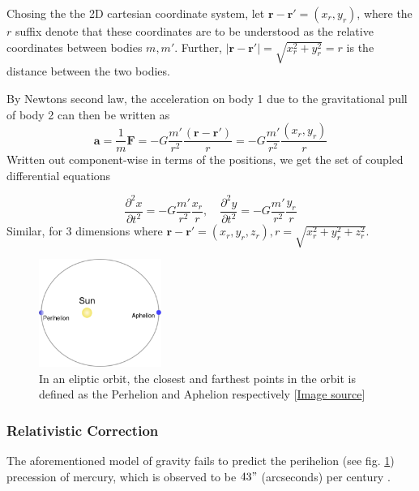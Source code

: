 \documentclass[10pt,showpacs,preprintnumbers,footinbib,amsmath,amssymb,aps,prl,twocolumn,groupedaddress,superscriptaddress,showkeys]{revtex4-1}
\begin{document}
    Chosing the the 2D cartesian coordinate system, let $\mathbf r - \mathbf r'= (x_{r}, y_{r})$, where the $r$ suffix denote that these coordinates are to be understood as the relative coordinates between bodies $m, m'$.
    Further, $|\mathbf r - \mathbf r'| = \sqrt{x_r^2 + y_r^2} = r$ is the distance between the two bodies.

    By Newtons second law, the acceleration on body 1 due to the gravitational pull of body 2 can then be written as
    \begin{equation}
      \mathbf a = \frac{1}{m}\mathbf F = -G \frac{m'}{r^2}\frac{(\mathbf r-\mathbf r')}{r} = -G\frac{m'}{r^2}\frac{\left(x_r, y_r\right)}{r}
    \end{equation}
    Written out component-wise in terms of the positions, we get the set of coupled differential equations

    \begin{equation}
      \frac{\partial^2 x}{\partial t^2} = -G\frac{m'}{r^2}\frac{x_r}{r}, \quad
      \frac{\partial^2 y}{\partial t^2} = -G\frac{m'}{r^2}\frac{y_r}{r}
    \end{equation}
    Similar, for 3 dimensions where $\mathbf r - \mathbf r' = (x_r, y_r, z_r), r=\sqrt{x_r^2 + y_r^2 + z_r^2}$.

      \begin{figure}[h!]
        \center
        \includegraphics[width=4cm]{figs/486px-Perihelion-Aphelion.png}
        \caption{In an eliptic orbit, the closest and farthest points in the orbit is defined as the Perhelion and Aphelion respectively [\href{https://en.wikipedia.org/wiki/Perihelion_and_aphelion}{Image source}]}
        \label{fig:perhelion}
      \end{figure}
    
    \subsubsection{Relativistic Correction}

      The aforementioned model of gravity fails to predict the perihelion (see fig. \ref{fig:perhelion}) precession of mercury, which is observed to be $43"$ (arcseconds) per century \cite{problem_set}. 
\end{document}
